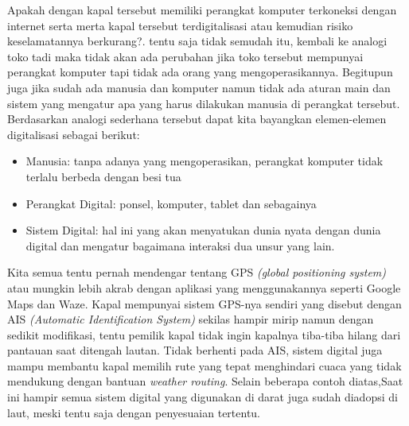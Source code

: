 Apakah dengan kapal tersebut memiliki perangkat komputer terkoneksi dengan internet serta merta kapal tersebut terdigitalisasi atau kemudian risiko keselamatannya berkurang?. tentu saja tidak semudah itu, kembali ke analogi toko tadi maka tidak akan ada perubahan jika toko tersebut mempunyai perangkat komputer tapi tidak ada orang yang mengoperasikannya. Begitupun juga jika sudah ada manusia dan komputer namun tidak ada aturan main dan sistem yang mengatur apa yang harus dilakukan manusia di perangkat tersebut. Berdasarkan analogi sederhana tersebut dapat kita bayangkan elemen-elemen digitalisasi sebagai berikut:
\begin{itemize}
    \item Manusia: tanpa adanya yang mengoperasikan, perangkat komputer tidak terlalu berbeda dengan besi tua
    \item Perangkat Digital: ponsel, komputer, tablet dan sebagainya
    \item Sistem Digital: hal ini yang akan menyatukan dunia nyata dengan dunia digital dan mengatur bagaimana interaksi dua unsur yang lain.
\end{itemize} 

Kita semua tentu pernah mendengar tentang GPS {\em (global positioning system)} atau mungkin lebih akrab dengan aplikasi yang menggunakannya seperti Google Maps dan Waze. Kapal mempunyai sistem GPS-nya sendiri yang disebut dengan AIS {\em (Automatic Identification System)} sekilas hampir mirip namun dengan sedikit modifikasi, tentu pemilik kapal tidak ingin kapalnya tiba-tiba hilang dari pantauan saat ditengah lautan. Tidak berhenti pada AIS, sistem digital juga mampu membantu kapal memilih rute yang tepat menghindari cuaca yang tidak mendukung dengan bantuan {\em weather routing}. Selain beberapa contoh diatas,Saat ini hampir semua sistem digital yang digunakan di darat juga sudah diadopsi di laut, meski tentu saja dengan penyesuaian tertentu.



